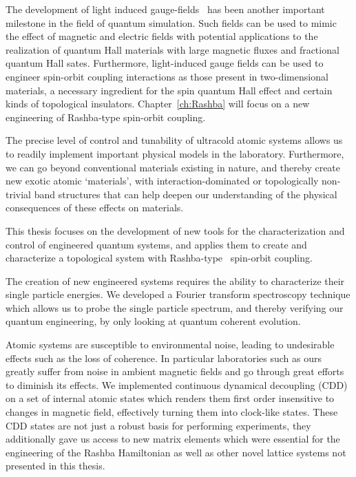 The development of light induced gauge-fields~\cite{goldman_light-induced_2014} has been another important milestone in the field of quantum simulation. Such fields can be used to mimic the effect of magnetic and electric fields with potential applications to the realization of quantum Hall materials with large magnetic fluxes and fractional quantum Hall sates. Furthermore, light-induced gauge fields can be used to engineer spin-orbit coupling interactions as those present in two-dimensional materials, a necessary ingredient for the spin quantum Hall effect and certain kinds of topological insulators. Chapter~\ref{ch:Rashba} will focus on a new engineering of Rashba-type spin-orbit coupling. 

The precise level of control and tunability of ultracold atomic systems allows us to readily implement important physical models in the laboratory. Furthermore, we can go beyond conventional materials existing in nature, and thereby create new exotic atomic `materials', with interaction-dominated or topologically non-trivial band structures that can help deepen our understanding of the physical consequences of these effects on materials.

This thesis focuses on the development of new tools for the characterization and control of engineered quantum systems, and applies them to create and characterize a topological system with Rashba-type~\cite{bychkov_oscillatory_1984} spin-orbit coupling. 

The creation of new engineered systems requires the ability to characterize their single particle energies. We developed a Fourier transform spectroscopy technique which allows us to probe the single particle spectrum, and thereby verifying our quantum engineering, by only looking at quantum coherent evolution. 

Atomic systems are susceptible to environmental noise, leading to undesirable effects such as the loss of coherence. In particular laboratories such as ours greatly suffer from noise in ambient magnetic fields and go through great efforts to diminish its effects. We implemented continuous dynamical decoupling (CDD) on a set of internal atomic states which renders them first order insensitive to changes in magnetic field, effectively turning them into clock-like states. These CDD states are not just a robust basis for performing experiments, they additionally gave us access to new matrix elements which were essential for the engineering of the Rashba Hamiltonian as well as other novel lattice systems not presented in this thesis. 

